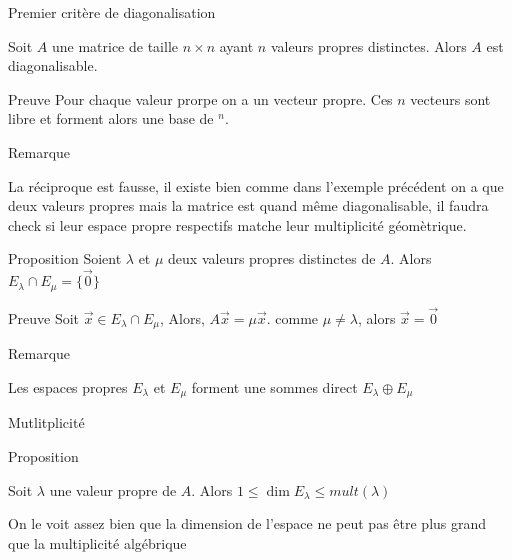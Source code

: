 \begin{parag}{Premier critère de diagonalisation}
    \begin{theoreme}
        Soit $A$ une matrice de taille $n \times n$ ayant $n$ valeurs propres distinctes. Alors $A$ est diagonalisable.
    \end{theoreme}
    \begin{subparag}{Preuve}
        Pour chaque valeur prorpe on a un vecteur propre. Ces $n$ vecteurs sont libre et forment alors une base de \R$^n$.
    \end{subparag}
        \begin{subparag}{Remarque}
        \begin{framedremark}
            
        
        La réciproque est fausse, il existe bien comme dans l'exemple précédent on a que deux valeurs propres mais la matrice est quand même diagonalisable, il faudra check si leur espace propre respectifs matche leur multiplicité géomètrique.
        \end{framedremark}
    \end{subparag}

    \begin{subparag}{Proposition}
        Soient $\lambda$ et $\mu$ deux valeurs propres distinctes de $A$. Alors $E_\lambda \cap E_\mu = \{\vec{0}\}$
    \end{subparag}
    \begin{subparag}{Preuve}
        Soit $\vec{x} \in E_\lambda \cap E_\mu$, Alors, $A\vec{x} = \mu\vec{x}$. comme $\mu \neq \lambda$, alors $\vec{x}= \vec{0}$
    \end{subparag}
    \begin{subparag}{Remarque}
        \begin{framedremark}
            Les espaces propres $E_\lambda$ et $E_\mu$ forment une sommes direct $E_\lambda \oplus E_\mu$
        \end{framedremark}
    \end{subparag}
\end{parag}

\begin{parag}{Mutlitplicité}
    \begin{subparag}{Proposition}
    \begin{theoreme}
        Soit $\lambda$ une valeur propre de $A$. Alors $1 \leq \dim E_\lambda \leq mult(\lambda)$
    \end{theoreme}
    On le voit assez bien que la dimension de l'espace ne peut pas être plus grand que la multiplicité algébrique
    \end{subparag}
    
\end{parag}


